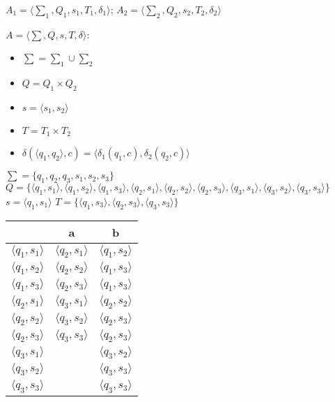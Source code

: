 \documentclass[a4paper,12pt]{article}
\begin{document}
\begingroup
\raggedleft 
$A_1 = {\langle\sum_1 , Q_1, s_1, T_1, \delta_1 \rangle}$;
$A_2 = {\langle\sum_2 , Q_2, s_2, T_2, \delta_2 \rangle}$\newline
\endgroup
\begingroup
\raggedright 
$A = {\langle\sum , Q, s, T, \delta \rangle}$:
\begin{itemize}
\item $\sum = \sum_1 \cup \sum_2$
\item $Q = Q_1 \times Q_2$
\item $s = \langle s_1 , s_2\rangle$
\item $T = T_1 \times T_2$
\item $\delta(\langle q_1 , q_2\rangle, c) =  \langle \delta_1 (q_1 , c), \delta_2 (q_2, c) \rangle$
\end{itemize}
$\sum = \{q_1, q_2, q_3, s_1, s_2, s_3\}$\newline
\normalsize $Q = \{\langle q_1 , s_1 \rangle ,\langle q_1 , s_2 \rangle ,\langle q_1 , s_3 \rangle , \langle q_2 , s_1 \rangle , \langle q_2 , s_2 \rangle , \langle q_2 , s_3 \rangle , \langle q_3 , s_1 \rangle , \langle q_3 , s_2 \rangle , \langle q_3 , s_3 \rangle \}$\newline
\Large $s = \langle q_1 , s_1 \rangle$\newline
$T = \{\langle q_1 , s_3 \rangle ,\langle q_2 , s_3 \rangle ,\langle q_3 , s_3 \rangle\}$\newline
\begin{center}
\begin{tabular}{ |c|c|c| } 
\hline
  & a & b \\ [0.5ex] 
 \hline
 $\langle q_1 , s_1 \rangle$ & $\langle q_2 , s_1 \rangle$ & $\langle q_1 , s_2 \rangle$ \\ 
 $\langle q_1 , s_2 \rangle $ & $\langle q_2 , s_2 \rangle$ & $\langle q_1 , s_3 \rangle$ \\ 
 $\langle q_1 , s_3 \rangle $ & $\langle q_2 , s_3 \rangle$ & $\langle q_1 , s_3 \rangle$ \\ 
 $\langle q_2 , s_1 \rangle $ & $\langle q_3 , s_1 \rangle$ & $\langle q_2 , s_2 \rangle$ \\ 
 $\langle q_2 , s_2 \rangle $ & $\langle q_3 , s_2 \rangle$ & $\langle q_2 , s_3 \rangle$ \\
 $\langle q_2 , s_3 \rangle $ & $\langle q_3 , s_3 \rangle$ & $\langle q_2 , s_3 \rangle$ \\
 $\langle q_3 , s_1 \rangle $ &  & $\langle q_3 , s_2 \rangle$ \\
 $\langle q_3 , s_2 \rangle $ &  & $\langle q_3 , s_3 \rangle$ \\
 $\langle q_3 , s_3 \rangle $ &  & $\langle q_3 , s_3 \rangle$ \\
 \hline
\end{tabular}
\end{center}
\end{document}
